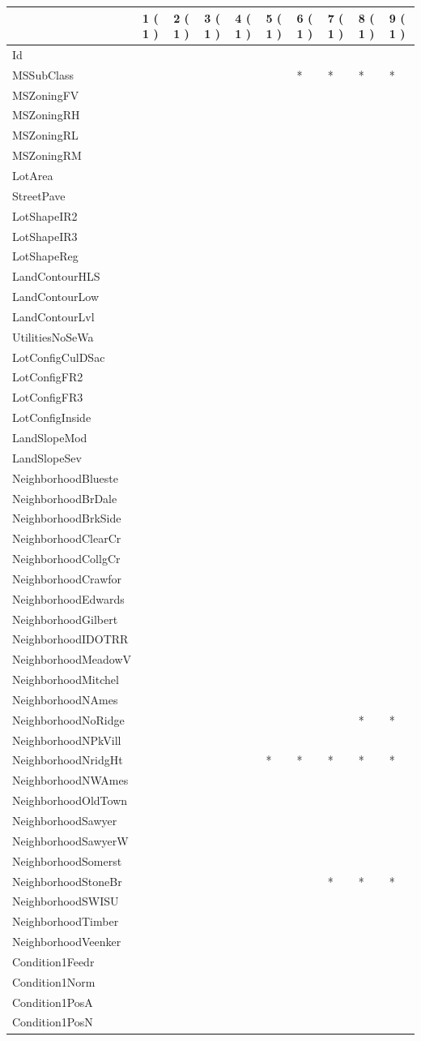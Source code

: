 \documentclass[]{article}
\begin{document}
\begin{longtable}[]{@{}llllllllll@{}}
\toprule
& 1 ( 1 ) & 2 ( 1 ) & 3 ( 1 ) & 4 ( 1 ) & 5 ( 1 ) & 6 ( 1 ) & 7 ( 1 ) &
8 ( 1 ) & 9 ( 1 )\tabularnewline
\midrule
\endhead
Id & & & & & & & & &\tabularnewline
MSSubClass & & & & & & * & * & * & *\tabularnewline
MSZoningFV & & & & & & & & &\tabularnewline
MSZoningRH & & & & & & & & &\tabularnewline
MSZoningRL & & & & & & & & &\tabularnewline
MSZoningRM & & & & & & & & &\tabularnewline
LotArea & & & & & & & & &\tabularnewline
StreetPave & & & & & & & & &\tabularnewline
LotShapeIR2 & & & & & & & & &\tabularnewline
LotShapeIR3 & & & & & & & & &\tabularnewline
LotShapeReg & & & & & & & & &\tabularnewline
LandContourHLS & & & & & & & & &\tabularnewline
LandContourLow & & & & & & & & &\tabularnewline
LandContourLvl & & & & & & & & &\tabularnewline
UtilitiesNoSeWa & & & & & & & & &\tabularnewline
LotConfigCulDSac & & & & & & & & &\tabularnewline
LotConfigFR2 & & & & & & & & &\tabularnewline
LotConfigFR3 & & & & & & & & &\tabularnewline
LotConfigInside & & & & & & & & &\tabularnewline
LandSlopeMod & & & & & & & & &\tabularnewline
LandSlopeSev & & & & & & & & &\tabularnewline
NeighborhoodBlueste & & & & & & & & &\tabularnewline
NeighborhoodBrDale & & & & & & & & &\tabularnewline
NeighborhoodBrkSide & & & & & & & & &\tabularnewline
NeighborhoodClearCr & & & & & & & & &\tabularnewline
NeighborhoodCollgCr & & & & & & & & &\tabularnewline
NeighborhoodCrawfor & & & & & & & & &\tabularnewline
NeighborhoodEdwards & & & & & & & & &\tabularnewline
NeighborhoodGilbert & & & & & & & & &\tabularnewline
NeighborhoodIDOTRR & & & & & & & & &\tabularnewline
NeighborhoodMeadowV & & & & & & & & &\tabularnewline
NeighborhoodMitchel & & & & & & & & &\tabularnewline
NeighborhoodNAmes & & & & & & & & &\tabularnewline
NeighborhoodNoRidge & & & & & & & & * & *\tabularnewline
NeighborhoodNPkVill & & & & & & & & &\tabularnewline
NeighborhoodNridgHt & & & & & * & * & * & * & *\tabularnewline
NeighborhoodNWAmes & & & & & & & & &\tabularnewline
NeighborhoodOldTown & & & & & & & & &\tabularnewline
NeighborhoodSawyer & & & & & & & & &\tabularnewline
NeighborhoodSawyerW & & & & & & & & &\tabularnewline
NeighborhoodSomerst & & & & & & & & &\tabularnewline
NeighborhoodStoneBr & & & & & & & * & * & *\tabularnewline
NeighborhoodSWISU & & & & & & & & &\tabularnewline
NeighborhoodTimber & & & & & & & & &\tabularnewline
NeighborhoodVeenker & & & & & & & & &\tabularnewline
Condition1Feedr & & & & & & & & &\tabularnewline
Condition1Norm & & & & & & & & &\tabularnewline
Condition1PosA & & & & & & & & &\tabularnewline
Condition1PosN & & & & & & & & &\tabularnewline

\end{longtable}
\end{document}
